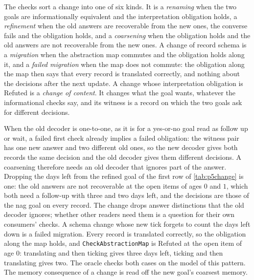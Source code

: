 \documentclass[11pt]{article}
\newcommand{\code}[1]{\texttt{#1}}
\theoremstyle{definition}
\theoremstyle{plain}
\begin{document}
The checks sort a change into one of six kinds. It is a \emph{renaming} when the two goals are
informationally equivalent and the interpretation obligation holds, a \emph{refinement} when the
old answers are recoverable from the new ones, the converse fails and the obligation holds, and a
\emph{coarsening} when the obligation holds and the old answers are not recoverable from the new
ones. A change of record schema is a \emph{migration} when the abstraction map commutes and the
obligation holds along it, and a \emph{failed migration} when the map does not commute: the
obligation along the map then says that every record is translated correctly, and nothing about
the decisions after the next update. A change whose interpretation obligation is Refuted is a
\emph{change of content}. It changes what the goal wants, whatever the informational checks say,
and its witness is a record on which the two goals ask for different decisions.

When the old decoder is one-to-one, as it is for a yes-or-no goal read as follow up or wait, a
failed first check already implies a failed obligation: the witness pair has one new answer and two
different old ones, so the new decoder gives both records the same decision and the old decoder
gives them different decisions. A coarsening therefore needs an old decoder that ignores part of
the answer. Dropping the days left from the refined goal of the first row of \cref{tab:p5change}
is one: the old answers are not recoverable at the open items of ages $0$ and $1$, which both need a
follow-up with three and two days left, and the decisions are those of the nag goal on every
record. The change drops answer distinctions that the old decoder ignores; whether other readers
need them is a question for their own consumers' checks. A schema change whose new tick forgets to
count the days left down is a failed migration. Every record is translated correctly, so the
obligation along the map holds, and \code{CheckAbstractionMap} is Refuted at the open item of age
$0$: translating and then ticking gives three days left, ticking and then translating gives two.
The oracle checks both cases on the model of this pattern. The memory consequence of a change is
read off the new goal's coarsest memory.
\end{document}
